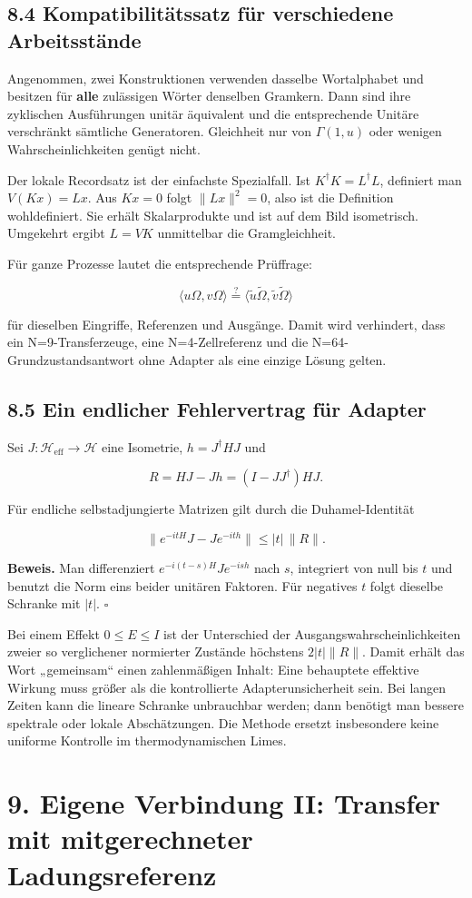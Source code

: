 \subsection{8.4 Kompatibilitätssatz für verschiedene
Arbeitsstände}\label{kompatibilituxe4tssatz-fuxfcr-verschiedene-arbeitsstuxe4nde}

Angenommen, zwei Konstruktionen verwenden dasselbe Wortalphabet und
besitzen für \textbf{alle} zulässigen Wörter denselben Gramkern. Dann
sind ihre zyklischen Ausführungen unitär äquivalent und die
entsprechende Unitäre verschränkt sämtliche Generatoren. Gleichheit nur
von \(\Gamma(1,u)\) oder wenigen Wahrscheinlichkeiten genügt nicht.

Der lokale Recordsatz ist der einfachste Spezialfall. Ist
\(K^\dagger K=L^\dagger L\), definiert man \(V(Kx)=Lx\). Aus \(Kx=0\)
folgt \(\|Lx\|^2=0\), also ist die Definition wohldefiniert. Sie erhält
Skalarprodukte und ist auf dem Bild isometrisch. Umgekehrt ergibt
\(L=VK\) unmittelbar die Gramgleichheit.

Für ganze Prozesse lautet die entsprechende Prüffrage:

\[\langle u\Omega,v\Omega\rangle
\stackrel{?}=\langle\widetilde u\widetilde\Omega,
\widetilde v\widetilde\Omega\rangle\]

für dieselben Eingriffe, Referenzen und Ausgänge. Damit wird verhindert,
dass ein N=9-Transferzeuge, eine N=4-Zellreferenz und die
N=64-Grundzustandsantwort ohne Adapter als eine einzige Lösung gelten.

\subsection{8.5 Ein endlicher Fehlervertrag für
Adapter}\label{ein-endlicher-fehlervertrag-fuxfcr-adapter}

Sei \(J:\mathcal H_{\mathrm{eff}}\to\mathcal H\) eine Isometrie,
\(h=J^\dagger HJ\) und

\[R=HJ-Jh=(I-JJ^\dagger)HJ.\]

Für endliche selbstadjungierte Matrizen gilt durch die Duhamel-Identität

\[\boxed{\|e^{-itH}J-Je^{-ith}\|\le |t|\,\|R\|.}\]

\textbf{Beweis.} Man differenziert \(e^{-i(t-s)H}Je^{-ish}\) nach \(s\),
integriert von null bis \(t\) und benutzt die Norm eins beider unitären
Faktoren. Für negatives \(t\) folgt dieselbe Schranke mit \(|t|\).
\(\square\)

Bei einem Effekt \(0\le E\le I\) ist der Unterschied der
Ausgangswahrscheinlichkeiten zweier so verglichener normierter Zustände
höchstens \(2|t|\|R\|\). Damit erhält das Wort „gemeinsam`` einen
zahlenmäßigen Inhalt: Eine behauptete effektive Wirkung muss größer als
die kontrollierte Adapterunsicherheit sein. Bei langen Zeiten kann die
lineare Schranke unbrauchbar werden; dann benötigt man bessere spektrale
oder lokale Abschätzungen. Die Methode ersetzt insbesondere keine
uniforme Kontrolle im thermodynamischen Limes.

\section{9. Eigene Verbindung II: Transfer mit mitgerechneter
Ladungsreferenz}\label{eigene-verbindung-ii-transfer-mit-mitgerechneter-ladungsreferenz}

